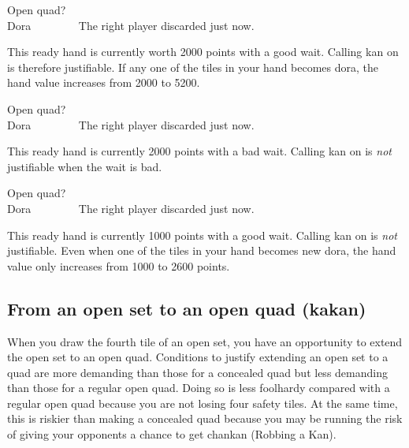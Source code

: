 \bigskip
\begin{itembox}[r]{Open quad?}
\bp
{}\zhong\zhong\zhong~~~\\
\hfill\footnotesize{{\jap Dora}~~~~~~~~}
\ep
\vspace{-20pt}The right player discarded {\LARGE\zhong} just now.
\end{itembox}
\noindent This ready hand is currently worth 2000 points with a good wait. Calling {\jap kan} on {\LARGE\zhong} is therefore justifiable. If any one of the tiles in your hand becomes {\jap dora}, the hand value increases from 2000 to 5200. 

\bigskip
\begin{itembox}[r]{Open quad?}
\bp
{}\zhong\zhong\zhong~~~\\
\hfill\footnotesize{{\jap Dora}~~~~~~~~}
\ep
\vspace{-20pt}The right player discarded {\LARGE\zhong} just now.
\end{itembox}
\noindent This ready hand is currently 2000 points with a bad wait. Calling {\jap kan} on {\LARGE\zhong} is \emph{not} justifiable when the wait is bad.

\bigskip
\begin{itembox}[r]{Open quad?}
\bp
{}\zhong\zhong\zhong~~~\\
\hfill\footnotesize{{\jap Dora}~~~~~~~~}
\ep
\vspace{-20pt}The right player discarded {\LARGE\zhong} just now.
\end{itembox}
\noindent This ready hand is currently 1000 points with a good wait. Calling {\jap kan} on {\LARGE\zhong} is \emph{not} justifiable. Even when one of the tiles in your hand becomes new {\jap dora}, the hand value only increases from 1000 to 2600 points. 

\subsection{From an open set to an open quad ({\jap kakan})}
When you draw the fourth tile of an open set, you have an opportunity to extend the open set to an open quad. Conditions to justify extending an open set to a quad are more demanding than those for a concealed quad but less demanding than those for a regular open quad. 
Doing so is less foolhardy compared with a regular open quad because you are not losing four safety tiles. At the same time, this is riskier than making a concealed quad because you may be running the risk of giving your opponents a chance to get {\jap chankan} (Robbing a Kan). 

